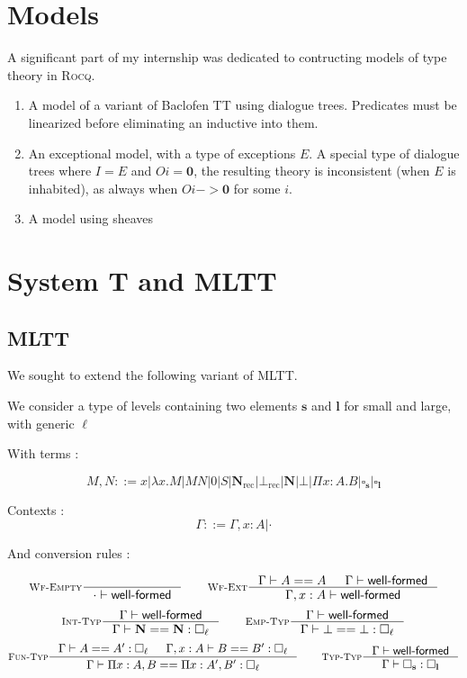 \documentclass{article}
\DeclareMathOperator{\rec}{rec}
\newcommand{\0}{\mathbf{0}}
\newcommand{\1}{\mathbf{1}}
\newcommand{\nat}{\mathbf{N}}
\newcommand{\Wf}{\textsf{well-formed}}
\newcommand{\slvl}{\mathbf{s}}
\newcommand{\llvl}{\mathbf{l}}
\begin{document}
\section{Models}

A significant part of my internship was dedicated to contructing models of type theory in \textsc{Rocq}.

\begin{enumerate}
    \item A model of a variant of Baclofen TT using dialogue trees. Predicates must be linearized before eliminating an inductive into them.
    \item An exceptional model, with a type of exceptions $E$. A special type of dialogue trees where $I = E$ and $O i = \mathbf{0}$, the resulting theory is inconsistent (when $E$ is inhabited), as always when $O i -> \mathbf{0}$ for some $i$.
    \item A model using sheaves
\end{enumerate}


\section{System T and MLTT}
\subsection{MLTT}
We sought to extend the following variant of MLTT.

We consider a type of levels containing two elements $\slvl$ and $\llvl$ for small and large, with generic $\ell$

With terms :

$$ M,N ::= x | \lambda x. M | MN | 0 | S | \nat_{\rec} | \bot_{\rec} | \nat | \bot | \Pi x :A.B | \square_\slvl | \square_\llvl$$


Contexts :
$$ \Gamma ::= \Gamma, x : A | \cdot $$

And conversion rules :

$$
    \inference[\textsc{Wf-Empty}]{}{\cdot |- \Wf} \qquad
    \inference[\textsc{Wf-Ext}]{\Gamma |- A == A & \Gamma |- \Wf}{ \Gamma, x : A |- \Wf}
$$
$$
    \inference[\textsc{Int-Typ}]{\Gamma |- \Wf}{\Gamma |- \nat == \nat : \square_\ell} \qquad
    \inference[\textsc{Emp-Typ}]{\Gamma |- \Wf}{\Gamma |- \bot == \bot : \square_\ell}
$$
$$
    \inference[\textsc{Fun-Typ}]{\Gamma |- A == A' : \square_\ell & \Gamma, x : A |- B == B' : \square_\ell}{\Gamma |- \Pi x  : A, B == \Pi x: A', B' : \square_\ell} \qquad
    \inference[\textsc{Typ-Typ}]{\Gamma |- \Wf}{\Gamma |- \square_\slvl : \square_\llvl}
$$
\end{document}
